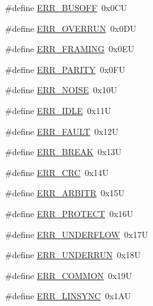 \begin{DoxyCompactItemize}
\item 
\#define \hyperlink{group___p_e___error__module_ga210385b149e9e04a454830bf0776cfcf}{E\+R\+R\+\_\+\+B\+U\+S\+O\+F\+F}~0x0\+C\+U
\item 
\#define \hyperlink{group___p_e___error__module_gae74be901f0269b1eb26bdc9da203fc86}{E\+R\+R\+\_\+\+O\+V\+E\+R\+R\+U\+N}~0x0\+D\+U
\item 
\#define \hyperlink{group___p_e___error__module_ga93dabff90378a5940feeb66d540016f0}{E\+R\+R\+\_\+\+F\+R\+A\+M\+I\+N\+G}~0x0\+E\+U
\item 
\#define \hyperlink{group___p_e___error__module_ga98e764e239ae37e9a70216cc7aa4ec64}{E\+R\+R\+\_\+\+P\+A\+R\+I\+T\+Y}~0x0\+F\+U
\item 
\#define \hyperlink{group___p_e___error__module_ga5b737bc2671b7207bb41b23b7edd0386}{E\+R\+R\+\_\+\+N\+O\+I\+S\+E}~0x10\+U
\item 
\#define \hyperlink{group___p_e___error__module_gaef1b4ee0b954443aaeb5c106d13bb70c}{E\+R\+R\+\_\+\+I\+D\+L\+E}~0x11\+U
\item 
\#define \hyperlink{group___p_e___error__module_ga90cb6ddc0765a1390dd484202f5169db}{E\+R\+R\+\_\+\+F\+A\+U\+L\+T}~0x12\+U
\item 
\#define \hyperlink{group___p_e___error__module_gae7143596878f82b81e311828b171034d}{E\+R\+R\+\_\+\+B\+R\+E\+A\+K}~0x13\+U
\item 
\#define \hyperlink{group___p_e___error__module_gae2f8372efd8fbf20128240c45f597109}{E\+R\+R\+\_\+\+C\+R\+C}~0x14\+U
\item 
\#define \hyperlink{group___p_e___error__module_gafd7b5442caf73be59c1917b3e9741c32}{E\+R\+R\+\_\+\+A\+R\+B\+I\+T\+R}~0x15\+U
\item 
\#define \hyperlink{group___p_e___error__module_gabf20f3e8d98667fc04b0c79ddc756edf}{E\+R\+R\+\_\+\+P\+R\+O\+T\+E\+C\+T}~0x16\+U
\item 
\#define \hyperlink{group___p_e___error__module_ga0e0f76be42ac68519b962029a71317ed}{E\+R\+R\+\_\+\+U\+N\+D\+E\+R\+F\+L\+O\+W}~0x17\+U
\item 
\#define \hyperlink{group___p_e___error__module_gad63d6a13b7456014efbf4eeeb3c3ace4}{E\+R\+R\+\_\+\+U\+N\+D\+E\+R\+R\+U\+N}~0x18\+U
\item 
\#define \hyperlink{group___p_e___error__module_ga60f7c1fa4fb4fb9ac4883eac3a7a7961}{E\+R\+R\+\_\+\+C\+O\+M\+M\+O\+N}~0x19\+U
\item 
\#define \hyperlink{group___p_e___error__module_ga0f54dc49decc242d4a14cb0b2c1099e6}{E\+R\+R\+\_\+\+L\+I\+N\+S\+Y\+N\+C}~0x1\+A\+U
\item 

\end{DoxyCompactItemize}

